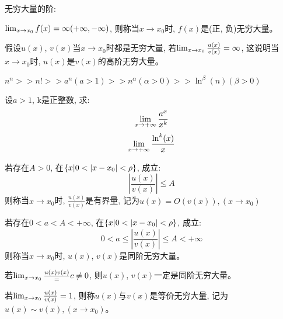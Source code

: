 \documentclass[lang=cn]{elegantbook}
\begin{document}
无穷大量的阶: 

$\lim_{x \to x_0 } f(x) = \infty (+\infty, -\infty)$, 则称当$x \to x_0$时, $f(x)$是(正, 负)无穷大量。

\begin{definition}
    假设$u(x)$, $v(x)$当$x \to x_0$时都是无穷大量, 若$\lim_{x \to x_0 } \frac{u(x)}{v(x)} = \infty$, 这说明当$x \to x_0$时, $u(x)$是$v(x)$的高阶无穷大量。
\end{definition}

$n^n >> n! >> a^n(a > 1) >> n^\alpha(\alpha > 0) >> \ln^\beta(n)(\beta > 0)$

\begin{proposition}
    设$a > 1$, k是正整数, 求: 
    \[ \lim_{x \to +\infty } \frac{a^x}{x^k} \]
    \[ \lim_{x \to +\infty } \frac{\ln^k(x)}{x}\]
\end{proposition}
\begin{definition}
    若存在$A > 0$, 在$\left\{ x | 0 < \left| x - x_0\right| < \rho\right\}$, 成立:
    \[ \left| \frac{u(x)}{v(x)} \right| \le A \]
    则称当$x \to x_0$时, $\frac{u(x)}{v(x)}$是有界量, 记为$u(x) = O(v(x)), (x \to x_0)$
\end{definition}

\begin{definition}
    若存在$0 < a < A < +\infty$, 在$\left\{ x | 0 < \left| x - x_0\right| < \rho\right\}$, 成立:
    \[ 0 < a \le \left| \frac{u(x)}{v(x)} \right| \le A < +\infty \]
    则称当$x \to x_0$时, $u(x)$, $v(x)$是同阶无穷大量。
\end{definition}
若$\lim_{x \to x_0 } \frac{u(x){v(x)}} = c \neq 0$, 则$u(x)$, $v(x)$一定是同阶无穷大量。
\begin{definition}
    若$\lim_{x \to x_0 } \frac{u(x)}{v(x)} = 1$, 则称$u(x)$与$v(x)$是等价无穷大量, 记为$u(x) \sim v(x), (x \to x_0)$。
\end{definition}
\end{document}
